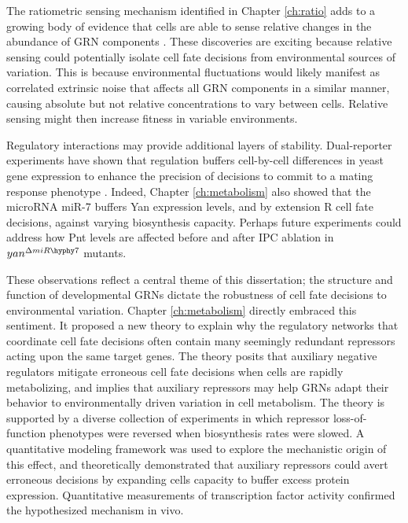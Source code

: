 The ratiometric sensing mechanism identified in Chapter \ref{ch:ratio} adds to a growing body of evidence that cells are able to sense relative changes in the abundance of GRN components \cite{Goentoro2009a,Frick2017}. These discoveries are exciting because relative sensing could potentially isolate cell fate decisions from environmental sources of variation. This is because environmental fluctuations would likely manifest as correlated extrinsic noise that affects all GRN components in a similar manner, causing absolute but not relative concentrations to vary between cells. Relative sensing might then increase fitness in variable environments. 

Regulatory interactions may provide additional layers of stability. Dual-reporter experiments have shown that regulation buffers cell-by-cell differences in yeast gene expression to enhance the precision of decisions to commit to a mating response phenotype \cite{Colman-Lerner2005}. Indeed, Chapter \ref{ch:metabolism} also showed that the microRNA miR-7 buffers Yan expression levels, and by extension R cell fate decisions, against varying biosynthesis capacity. Perhaps future experiments could address how Pnt levels are affected before and after IPC ablation in $yan^{\Delta miR\hyphy 7}$ mutants. 

These observations reflect a central theme of this dissertation; the structure and function of developmental GRNs dictate the robustness of cell fate decisions to environmental variation. Chapter \ref{ch:metabolism} directly embraced this sentiment. It proposed a new theory to explain why the regulatory networks that coordinate cell fate decisions often contain many seemingly redundant repressors acting upon the same target genes. The theory posits that auxiliary negative regulators mitigate erroneous cell fate decisions when cells are rapidly metabolizing, and implies that auxiliary repressors may help GRNs adapt their behavior to environmentally driven variation in cell metabolism. The theory is supported by a diverse collection of experiments in which repressor loss-of-function phenotypes were reversed when biosynthesis rates were slowed. A quantitative modeling framework was used to explore the mechanistic origin of this effect, and theoretically demonstrated that auxiliary repressors could avert erroneous decisions by expanding cells capacity to buffer excess protein expression. Quantitative measurements of transcription factor activity confirmed the hypothesized mechanism in vivo.

